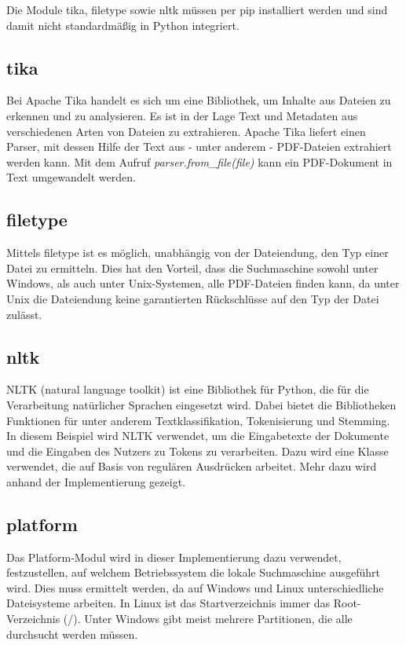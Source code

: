 Die Module tika, filetype sowie nltk müssen per pip installiert werden und sind damit nicht standardmäßig in Python integriert.


\subsection{tika}\label{apache-tika}
Bei Apache Tika handelt es sich um eine Bibliothek, um Inhalte aus Dateien zu erkennen und zu analysieren. Es ist in der Lage Text und Metadaten aus verschiedenen Arten von Dateien zu extrahieren. Apache Tika liefert einen Parser, mit dessen Hilfe der Text aus - unter anderem - PDF-Dateien extrahiert werden kann. Mit dem Aufruf \textit{parser.from\_file(file)} kann ein PDF-Dokument in Text umgewandelt werden.

\subsection{filetype}\label{python-magic}
Mittels filetype ist es möglich, unabhängig von der Dateiendung, den Typ einer Datei zu ermitteln. Dies hat den Vorteil, dass die Suchmaschine sowohl unter Windows, als auch unter Unix-Systemen, alle PDF-Dateien finden kann, da unter Unix die Dateiendung keine garantierten Rückschlüsse auf den Typ der Datei zulässt.

\subsection{nltk}\label{nltk}
NLTK (natural language toolkit) ist eine Bibliothek für Python, die für die Verarbeitung natürlicher Sprachen eingesetzt wird. Dabei bietet die Bibliotheken Funktionen für unter anderem Textklassifikation, Tokenisierung und Stemming.
In diesem Beispiel wird NLTK verwendet, um die Eingabetexte der Dokumente und die Eingaben des Nutzers zu Tokens zu verarbeiten. Dazu wird eine Klasse verwendet, die auf Basis von regulären Ausdrücken arbeitet. Mehr dazu wird anhand der Implementierung gezeigt. %

\subsection{platform}
Das Platform-Modul wird in dieser Implementierung dazu verwendet, festzustellen, auf welchem Betriebssystem die lokale Suchmaschine ausgeführt wird. Dies muss ermittelt werden, da auf Windows und Linux unterschiedliche Dateisysteme arbeiten. In Linux ist das Startverzeichnis immer das Root-Verzeichnis (\glqq /\grqq). Unter Windows gibt meist mehrere Partitionen, die alle durchsucht werden müssen.

